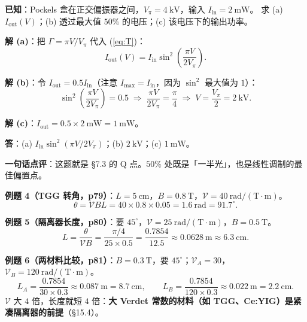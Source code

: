 \documentclass[11pt]{ctexart}
\let\subhdrtheme\subhdr
\renewcommand{\subhdr}[1]{\needspace{3\baselineskip}\subhdrtheme{#1}}
\newcommand{\vdt}{\mathcal{V}}
\begin{document}

\textbf{已知}：Pockels 盒在正交偏振器之间，$V_\pi=4\ \mathrm{kV}$，输入 $I_{\text{in}}=2\ \mathrm{mW}$。
求 (a) $I_{\text{out}}(V)$；(b) 透过最大值 $50\%$ 的电压；(c) 该电压下的输出功率。

\textbf{解 (a)}：把 $\Gamma=\pi V/V_\pi$ 代入 (\ref{eq:T})：
\begin{equation}
I_{\text{out}}(V)=I_{\text{in}}\sin^{2}\!\left(\frac{\pi V}{2V_\pi}\right).
\end{equation}

\textbf{解 (b)}：令 $I_{\text{out}}=0.5I_{\text{in}}$（注意 $I_{\max}=I_{\text{in}}$，因为 $\sin^2$ 最大值为 $1$）：
\begin{equation}
\sin^{2}\!\left(\frac{\pi V}{2V_\pi}\right)=0.5
\;\Longrightarrow\;
\frac{\pi V}{2V_\pi}=\frac{\pi}{4}
\;\Longrightarrow\;
V=\frac{V_\pi}{2}=2\ \mathrm{kV}.
\end{equation}

\textbf{解 (c)}：$I_{\text{out}}=0.5\times2\ \mathrm{mW}=1\ \mathrm{mW}$。

\textbf{答}：(a) $I_{\text{in}}\sin^{2}(\pi V/2V_\pi)$；(b) $2\ \mathrm{kV}$；(c) $1\ \mathrm{mW}$。

\textbf{一句话点评}：这题就是 §7.3 的 Q 点。$50\%$ 处既是「一半光」，也是线性调制的最佳偏置点。


\textbf{例题 4（TGG 转角，p79）}：$L=5\ \mathrm{cm}$，$B=0.8\ \mathrm{T}$，$\vdt=40\ \mathrm{rad/(T\cdot m)}$。
\begin{equation}
\theta=\vdt BL=40\times0.8\times0.05=1.6\ \mathrm{rad}=91.7^\circ .
\end{equation}

\textbf{例题 5（隔离器长度，p80）}：要 $45^\circ$，$\vdt=25\ \mathrm{rad/(T\cdot m)}$，$B=0.5\ \mathrm{T}$。
\begin{equation}
L=\frac{\theta}{\vdt B}=\frac{\pi/4}{25\times0.5}=\frac{0.7854}{12.5}\approx0.0628\ \mathrm{m}\approx6.3\ \mathrm{cm}.
\end{equation}

\textbf{例题 6（两材料比较，p81）}：$B=0.3\ \mathrm{T}$，要 $45^\circ$；$\vdt_A=30$，$\vdt_B=120\ \mathrm{rad/(T\cdot m)}$。
\begin{equation}
L_A=\frac{0.7854}{30\times0.3}\approx0.087\ \mathrm{m}=8.7\ \mathrm{cm},
\qquad
L_B=\frac{0.7854}{120\times0.3}\approx0.022\ \mathrm{m}=2.2\ \mathrm{cm}.
\end{equation}
$\vdt$ 大 $4$ 倍，长度就短 $4$ 倍：\textbf{大 Verdet 常数的材料（如 TGG、Ce:YIG）是紧凑隔离器的前提}（§15.4）。
\end{document}
